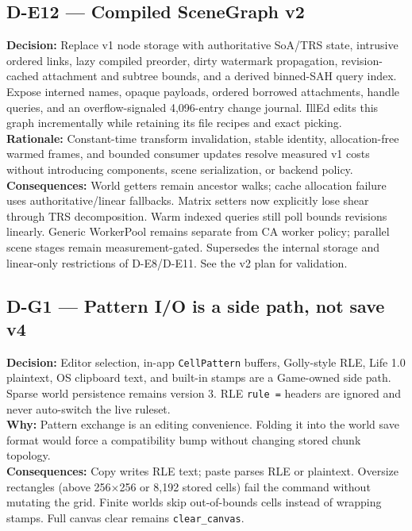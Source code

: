 \subsection*{D-E12 --- Compiled SceneGraph v2}
\begin{decisionbox}[title={D-E12 \quad 2026-09-17}]
\textbf{Decision:} Replace v1 node storage with authoritative SoA/TRS state,
intrusive ordered links, lazy compiled preorder, dirty watermark propagation,
revision-cached attachment and subtree bounds, and a derived binned-SAH query
index. Expose interned names, opaque payloads, ordered borrowed attachments,
handle queries, and an overflow-signaled 4,096-entry change journal. IllEd edits
this graph incrementally while retaining its file recipes and exact picking.\\
\textbf{Rationale:} Constant-time transform invalidation, stable identity,
allocation-free warmed frames, and bounded consumer updates resolve measured
v1 costs without introducing components, scene serialization, or backend policy.\\
\textbf{Consequences:} World getters remain ancestor walks; cache allocation
failure uses authoritative/linear fallbacks. Matrix setters now explicitly
lose shear through TRS decomposition. Warm indexed queries still poll bounds
revisions linearly. Generic WorkerPool remains separate from CA worker policy;
parallel scene stages remain measurement-gated. Supersedes the internal storage
and linear-only restrictions of D-E8/D-E11. See the v2 plan for validation.
\end{decisionbox}

\subsection*{D-G1 --- Pattern I/O is a side path, not save v4}
\begin{decisionbox}[title={D-G1 \quad 2026-08-21}]
\textbf{Decision:} Editor selection, in-app \texttt{CellPattern} buffers, Golly-style
RLE, Life 1.0 plaintext, OS clipboard text, and built-in stamps are a Game-owned
side path. Sparse world persistence remains version 3. RLE \texttt{rule =}
headers are ignored and never auto-switch the live ruleset.\\
\textbf{Why:} Pattern exchange is an editing convenience. Folding it into the
world save format would force a compatibility bump without changing stored
chunk topology.\\
\textbf{Consequences:} Copy writes RLE text; paste parses RLE or plaintext.
Oversize rectangles (above 256$\times$256 or 8,192 stored cells) fail the
command without mutating the grid. Finite worlds skip out-of-bounds cells
instead of wrapping stamps. Full canvas clear remains \texttt{clear\_canvas}.
\end{decisionbox}

